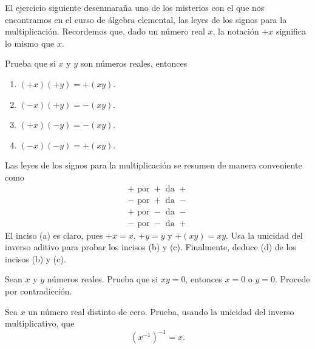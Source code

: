\documentclass[12pt,a4paper]{book}
\begin{document}
    El ejercicio siguiente desenmaraña uno de los misterios con el que nos
    encontramos en el curso de álgebra elemental, las leyes de los signos para
    la multiplicación. Recordemos que, dado un número real $x$, la notación $+x$
    significa lo mismo que $x$.

    \begin{ejercicio}\label{ej:14}
        Prueba que
        si $x$ y $y$ son números reales, entonces
        \begin{enumerate}[nosep]
            \item $(+x)(+y)=+(xy)$.
            \item $(-x)(+y)=-(xy)$.
            \item $(+x)(-y)=-(xy)$.
            \item $(-x)(-y)=+(xy)$.
        \end{enumerate}
        Las leyes de los signos para la multiplicación se resumen de manera conveniente
        como
        \begin{align*}
            +\text{ por }+\text{ da }+\\
            -\text{ por }+\text{ da }-\\
            +\text{ por }-\text{ da }-\\
            -\text{ por }-\text{ da }+
        \end{align*}
        \sugerencia El inciso (a) es claro, pues $+x=x$, $+y=y$ y $+(xy)=xy$. Usa
        la unicidad del inverso aditivo para probar los incisos (b) y (c). Finalmente,
        deduce (d) de los incisos (b) y (c).
    \end{ejercicio}

    \begin{ejercicio}\label{ej:15}
        Sean $x$ y $y$ números reales. Prueba que si $xy=0$, entonces
        $x=0$ o $y=0$. \sugerencia Procede por contradicción.
    \end{ejercicio}

    \begin{ejercicio}\label{ej:16}
        Sea $x$ un número real distinto de cero. Prueba, usando la unicidad
        del inverso multiplicativo, que
        \begin{equation*}
            (x^{-1})^{-1}=x.
        \end{equation*}
    \end{ejercicio}
\end{document}
